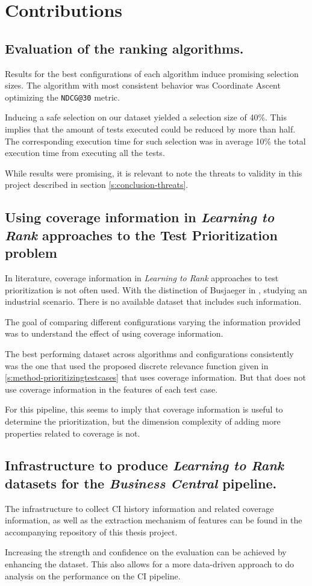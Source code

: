 \section{Contributions}

\subsection{Evaluation of the ranking algorithms.}

Results for the best configurations of each algorithm induce
promising selection sizes. The algorithm with most consistent behavior
was Coordinate Ascent optimizing the \texttt{NDCG@30} metric.

Inducing a safe selection on our dataset yielded a selection size of 40\%.
This implies that the amount of tests executed could be reduced by more than half.
The corresponding execution time for such selection was in average 10\% the total
execution time from executing all the tests.

While results were promising, it is relevant to note the threats to validity 
in this project described in section \ref{s:conclusion-threats}.

\subsection{Using coverage information in \emph{Learning to Rank} approaches to the Test Prioritization problem}

In literature, coverage information in \emph{Learning to Rank} approaches to 
test prioritization is not often used. With the distinction of Busjaeger in \cite{Busjaeger2016LearningFT},
studying an industrial scenario. There is no available dataset that includes such information.

The goal of comparing different configurations varying
the information provided was to understand the effect of using coverage information.

The best performing dataset across algorithms and configurations 
consistently was the one that used the proposed discrete relevance  
function given in \ref{s:method-prioritizingtestcases} that uses coverage information. 
But that does not use coverage information in the features of each test case.

For this pipeline, this seems to imply that coverage information is 
useful to determine the prioritization, but the dimension complexity 
of adding more properties related to coverage is not.

\subsection{Infrastructure to produce \emph{Learning to Rank} datasets for the \emph{Business Central} pipeline.}

The infrastructure to collect CI history information and related coverage information,
as well as the extraction mechanism of features can be found in the accompanying 
repository of this thesis project.

Increasing the strength and confidence on the evaluation can be achieved by
enhancing the dataset. This also allows for a more data-driven approach to
do analysis on the performance on the CI pipeline.